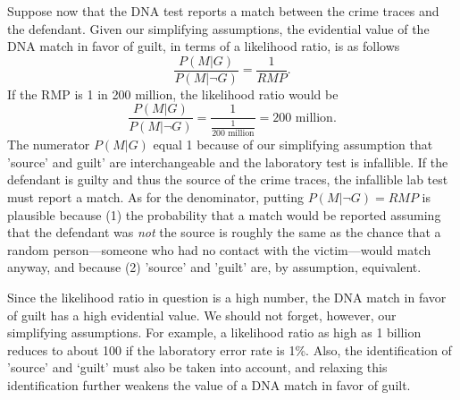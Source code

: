 \documentclass[10pt]{article}
\begin{document}
Suppose now that the DNA test reports a match between the crime 
traces and the defendant.  Given our simplifying assumptions, 
the evidential value of the DNA match in favor of guilt, in terms of a likelihood ratio, 
is as follows %
%
\[
\frac{P(M | G)}{P(M | \neg G)} =   \frac{1}{RMP}.
\]
%
If the RMP is 1 in 200 million, the likelihood ratio would be
%
\[\frac{P(M |G)}{P( M | \neg G)}=\frac{1}{\frac{1}{\text{200 million}}}=\text{200 million}.\]
%
The numerator $P(M | G)$ equal 1 because of our simplifying assumption that 'source' and guilt' are interchangeable 
and the laboratory test is infallible. If the defendant is guilty and thus the source of the crime traces, the infallible 
lab test must report a match. As for the denominator, 
putting $P(M | \neg G)=RMP$ is plausible because (1) the probability that a match would be reported assuming that the defendant was \textit{not} 
the source is roughly the same as the chance that a random person---someone who had no contact with the victim---would match anyway, 
and because (2) 'source' and 'guilt' are, by assumption, equivalent.



Since the likelihood ratio in question is a high number, the DNA match in favor of guilt 
has a high evidential value. We should not forget, however, 
our simplifying assumptions. For example, a likelihood ratio as high as 
1 billion reduces to about 100 if the laboratory error rate is 1\%.
Also, the identification of 'source' and 
`guilt' must also be taken into account, and relaxing this identification 
further weakens the value of a DNA match in favor of guilt.
\end{document}
